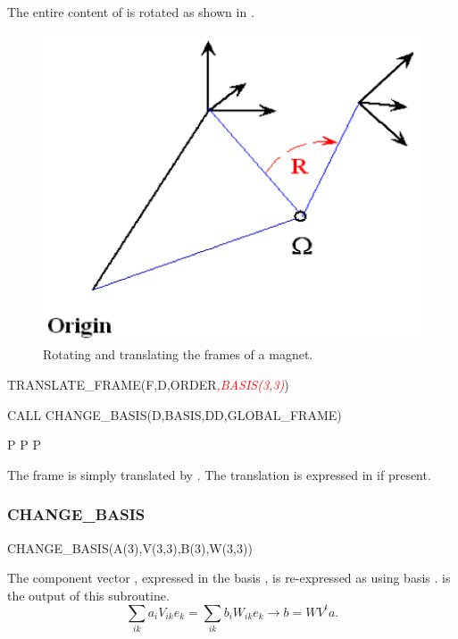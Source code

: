 The entire content of  is rotated as shown in .

\begin{figure}[ht]\forceversofloat
  \centering
  \includegraphics{illustrations/geo-routines-2}
  \caption{Rotating and translating the frames of a magnet.}
  \label{fig:Rotating-and-translating}
\end{figure}

%
\begin{ptccode}
TRANSLATE_FRAME(F,D,ORDER\textit{\textcolor{red}{,BASIS(3,3)}})

CALL CHANGE_BASIS(D,BASIS,DD,GLOBAL_FRAME)

P%
P%
P%
\end{ptccode}

The frame is simply translated by . The translation  is expressed
in  if present.


\subsubsection{CHANGE_BASIS}

%
\begin{ptccode}
CHANGE_BASIS(A(3),V(3,3),B(3),W(3,3))
\end{ptccode}

The component vector , expressed in the basis , is re-expressed
as  using basis .  is the output of this subroutine.
\begin{equation*}
  \sum_{ik} a_i V_{ik} e_k = \sum_{ik} b_i W_{ik} e_k
  \rightarrow b = WV^t a.
\end{equation*}


